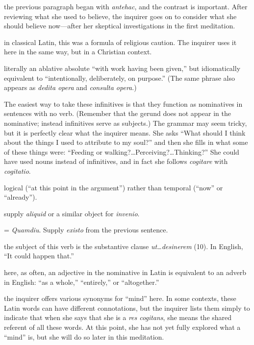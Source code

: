  the previous paragraph began with \textit{antehac}, and the contrast is important. After reviewing what she used to believe, the inquirer goes on to consider what she should believe now---after her skeptical investigations in the first meditation.

 in classical Latin, this was a formula of religious caution. The inquirer uses it here in the same way, but in a Christian context.

 literally an ablative absolute ``with work having been given,'' but idiomatically equivalent to ``intentionally, deliberately, on purpose.'' (The same phrase also appears as \textit{dedita opera} and \textit{consulta opera}.)

 The easiest way to take these infinitives is that they function as nominatives in sentences with no verb. (Remember that the gerund does not appear in the nominative; instead infinitives serve as subjects.) The grammar may seem tricky, but it is perfectly clear what the inquirer means. She asks ``What should I think about the things I used to attribute to my soul?'' and then she fills in what some of these things were: ``Feeding or walking?\dots Perceiving?\dots Thinking?'' She could have used nouns instead of infinitives, and in fact she follows \textit{cogitare} with \textit{cogitatio}.

 logical (``at this point in the argument'') rather than temporal (``now'' or ``already'').

 supply \textit{aliquid} or a similar object for \textit{invenio}.

 = \textit{Quamdiu}. Supply \textit{existo} from the previous sentence.

 the subject of this verb is the substantive clause \textit{ut\dots desinerem} (10). In English, ``It could happen that.''

 here, as often, an adjective in the nominative in Latin is equivalent to an adverb in English: ``as a whole,'' ``entirely,'' or ``altogether.''

 the inquirer offers various synonyms for ``mind'' here. In some contexts, these Latin words can have different connotations, but the inquirer lists them simply to indicate that when she says that she is a \textit{res cogitans}, she means the shared referent of all these words. At this point, she has not yet fully explored what a ``mind'' is, but she will do so later in this meditation.

